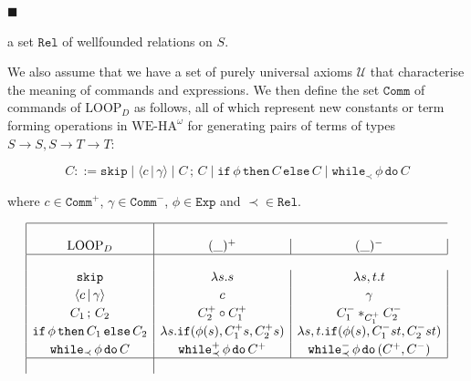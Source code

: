 \documentclass[10pt,a4paper]{article}
\begin{document}
 
 
\par\noindent  $\blacksquare$ 
 
a set $\mathtt{Rel}$ of wellfounded relations on $S$.\par
 
 
  
 
 
We also assume that we have a set of purely universal axioms $\mathcal{U}$ that characterise the meaning of commands and expressions. We then define the set $\mathtt{Comm}$ of commands of $\mathrm{LOOP}_{D}$ as follows, all of which represent new constants or term forming operations in $\mathrm{WE}\mbox{-}\mathrm{HA}^{\omega}$ for generating pairs of terms of types $S\to S,S\to T\to T$:\par
  
\par  \quad  \[C::=\mathtt{skip}\mid\langle{c}\,|\,{\gamma}\rangle\mid{C}\,;\,{C}\mid\mathtt{if}\,{\phi}\,\mathtt{then}\,{C}\,\mathtt{else}\,{C}\mid\mathtt{while}_{\prec}\,{\phi}\,\mathtt{do}\,{C}\]\quad  \quad  
  
where $c\in\mathtt{Comm}^{+}$, $\gamma\in\mathtt{Comm}^{-}$, $\phi\in\mathtt{Exp}$ and $\prec\in\mathtt{Rel}$.\par
 
 
   
\par  \quad  \[\begin{array}[]{|c|c|c|}\hline\cr\mathrm{LOOP}_{D}&(\_)^{+}&(\_)^{-}\\
\hline\cr\mathtt{skip}&\lambda s.s&\lambda s,t.t\\[1.99168pt]
\langle{c}\,|\,{\gamma}\rangle&c&\gamma\\[1.99168pt]
{C_{1}}\,;\,{C_{2}}&C_{2}^{+}\circ C_{1}^{+}&C_{1}^{-}\ast_{C_{1}^{+}}C_{2}^{-}\\[1.99168pt]
\mathtt{if}\,{\phi}\,\mathtt{then}\,{C_{1}}\,\mathtt{else}\,{C_{2}}&\lambda s.\mathtt{if}({\phi(s)},{C^{+}_{1}s},{C^{+}_{2}s})&\lambda s,t.\mathtt{if}({\phi(s)},{C^{-}_{1}st},{C^{-}_{2}st})\\[1.99168pt]
\mathtt{while}_{\prec}\,{\phi}\,\mathtt{do}\,{C}&\mathtt{while}^{+}_{\prec}\,{\phi}\,\mathtt{do}\,{C^{+}}&\mathtt{while}^{-}_{\prec}\,{\phi}\,\mathtt{do}\,{(C^{+},C^{-})}\\
\hline\cr\end{array}\]\quad  \quad  
   
\end{document}
